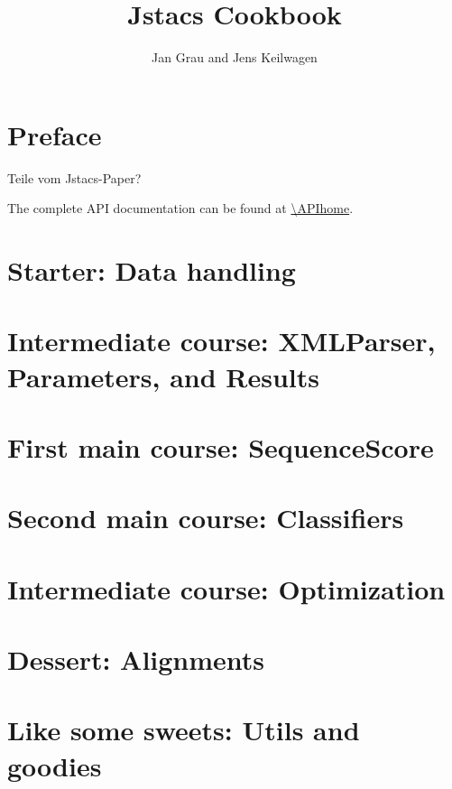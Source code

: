 \documentclass[a4paper]{report}
\author{Jan Grau and Jens Keilwagen}
\title{Jstacs Cookbook}
\begin{document}
\maketitle
\cleardoublepage

\tableofcontents
\clearpage

\section{Preface}

Teile vom Jstacs-Paper?

\vfill
The complete API documentation can be found at \url{\APIhome}.
\clearpage

\section{Starter: Data handling}\label{data}

\clearpage

\section{Intermediate course: XMLParser, Parameters, and Results}\label{sec:xmlparres}

\clearpage

\section{First main course: SequenceScore}\label{sequenceScore}

\clearpage

\section{Second main course: Classifiers}\label{classifier}

\clearpage

\section{Intermediate course: Optimization}

\section{Dessert: Alignments}

\section{Like some sweets: Utils and goodies}
\end{document}
